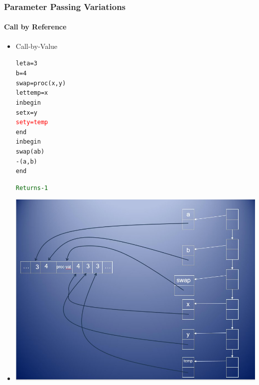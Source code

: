 \documentclass{beamer}
\begin{document}
\begin{frame}[fragile]
\frametitle{Parameter Passing Variations}
\framesubtitle{Call by Reference}
\begin{scriptsize}
\begin{itemize}
\item<1-> Call-by-Value
\begin{alltt}
\begin{tiny}
let a = 3
    b = 4
    swap = proc (x, y)
	        let temp = x
	        in begin
	             set x = y
	             \textcolor{red}{set y = temp}
	           end
in begin
     swap(a b)
     -(a, b)
   end                            \begin{normalsize} \textcolor{darkgreen}{Returns -1} \end{normalsize}
\end{tiny}
\end{alltt}

\item<1->
\begin{center}
\includegraphics[scale=0.35]{cbv-cbr5.jpg}
\end{center}


\end{itemize}
\end{scriptsize}
\end{frame}
\end{document}
